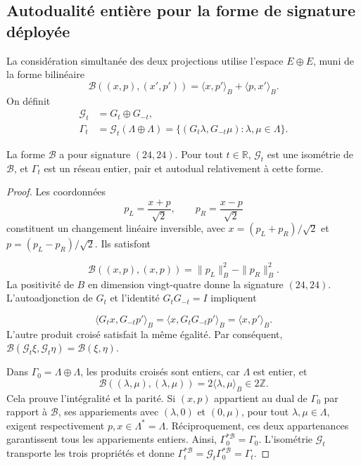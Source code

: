 \subsection{Autodualité entière pour la forme de signature déployée}
\label{corpus9:xii:autodualidad-partida}

La considération simultanée des deux projections utilise l’espace
\(E\oplus E\), muni de la forme bilinéaire
\begin{equation}
 \mathcal B((x,p),(x',p'))
 =\langle x,p'\rangle_B+\langle p,x'\rangle_B.
 \label{corpus9:xii:forma-bilineal-partida}
\end{equation}
On définit
\begin{equation}
 \begin{aligned}
 \mathcal G_t&=G_t\oplus G_{-t},\\
 \Gamma_t&=\mathcal G_t(\Lambda\oplus\Lambda)
 =\{(G_t\lambda,G_{-t}\mu):\lambda,\mu\in\Lambda\}.
 \end{aligned}
 \label{corpus9:xii:red-partida}
\end{equation}

\begin{theorem}
\label{corpus9:xii:teorema-partido}
La forme \(\mathcal B\) a pour signature \((24,24)\).
Pour tout \(t\in\mathbb R\), \(\mathcal G_t\) est une isométrie
de \(\mathcal B\), et \(\Gamma_t\) est un réseau entier, pair et
autodual relativement à cette forme.
\end{theorem}
\begin{proof}
Les coordonnées
\[
 p_L=\frac{x+p}{\sqrt2},\qquad p_R=\frac{x-p}{\sqrt2}
\]
constituent un changement linéaire inversible, avec
\(x=(p_L+p_R)/\sqrt2\) et \(p=(p_L-p_R)/\sqrt2\). Ils satisfont

\[
 \mathcal B((x,p),(x,p))=\|p_L\|_B^2-\|p_R\|_B^2.
\]
La positivité de \(B\) en dimension vingt-quatre donne la signature
\((24,24)\). L’autoadjonction de \(G_t\) et l’identité
\(G_tG_{-t}=I\) impliquent

\[
 \langle G_tx,G_{-t}p'\rangle_B
 =\langle x,G_tG_{-t}p'\rangle_B=\langle x,p'\rangle_B.
\]
L’autre produit croisé satisfait la même égalité. Par conséquent,
\(\mathcal B(\mathcal G_t\xi,\mathcal G_t\eta)
=\mathcal B(\xi,\eta)\).

Dans \(\Gamma_0=\Lambda\oplus\Lambda\), les produits croisés sont
entiers, car \(\Lambda\) est entier, et
\[
 \mathcal B((\lambda,\mu),(\lambda,\mu))
 =2\langle\lambda,\mu\rangle_B\in2\mathbb Z.
\]
Cela prouve l’intégralité et la parité. Si \((x,p)\) appartient au dual
de \(\Gamma_0\) par rapport à \(\mathcal B\), ses appariements
avec \((\lambda,0)\) et \((0,\mu)\), pour tout
\(\lambda,\mu\in\Lambda\), exigent respectivement
\(p,x\in\Lambda^*=\Lambda\). Réciproquement, ces deux appartenances
garantissent tous les appariements entiers. Ainsi,
\(\Gamma_0^{*\mathcal B}=\Gamma_0\). L’isométrie
\(\mathcal G_t\) transporte les trois propriétés et donne
\(\Gamma_t^{*\mathcal B}=\mathcal G_t\Gamma_0^{*\mathcal B}
=\Gamma_t\).
\end{proof}


